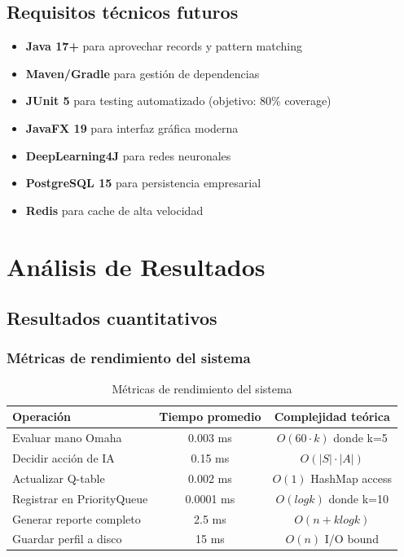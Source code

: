 \documentclass[12pt,a4paper]{article}
\begin{document}
\subsection{Requisitos técnicos futuros}

\begin{itemize}
    \item \textbf{Java 17+} para aprovechar records y pattern matching
    \item \textbf{Maven/Gradle} para gestión de dependencias
    \item \textbf{JUnit 5} para testing automatizado (objetivo: 80\% coverage)
    \item \textbf{JavaFX 19} para interfaz gráfica moderna
    \item \textbf{DeepLearning4J} para redes neuronales
    \item \textbf{PostgreSQL 15} para persistencia empresarial
    \item \textbf{Redis} para cache de alta velocidad
\end{itemize}

\newpage

\section{Análisis de Resultados}

\subsection{Resultados cuantitativos}

\subsubsection{Métricas de rendimiento del sistema}

\begin{table}[H]
\centering
\begin{tabular}{|l|c|c|}
\hline
\textbf{Operación} & \textbf{Tiempo promedio} & \textbf{Complejidad teórica} \\
\hline
Evaluar mano Omaha & 0.003 ms & $O(60 \cdot k)$ donde k=5 \\
Decidir acción de IA & 0.15 ms & $O(|S| \cdot |A|)$ \\
Actualizar Q-table & 0.002 ms & $O(1)$ HashMap access \\
Registrar en PriorityQueue & 0.0001 ms & $O(log k)$ donde k=10 \\
Generar reporte completo & 2.5 ms & $O(n + k log k)$ \\
Guardar perfil a disco & 15 ms & $O(n)$ I/O bound \\
\hline
\end{tabular}
\caption{Métricas de rendimiento del sistema}
\end{table}
\end{document}
